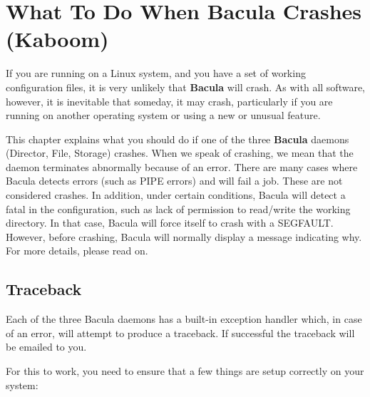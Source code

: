 
\chapter{What To Do When Bacula Crashes (Kaboom)}
\label{KaboomChapter}

If you are running on a Linux system, and you have a set of working
configuration files, it is very unlikely that {\bf Bacula} will crash. As with
all software, however, it is inevitable that someday, it may crash,
particularly if you are running on another operating system or using a new or
unusual feature. 

This chapter explains what you should do if one of the three {\bf Bacula}
daemons (Director, File, Storage) crashes.  When we speak of crashing, we 
mean that the daemon terminates abnormally because of an error.  There are
many cases where Bacula detects errors (such as PIPE errors) and will fail 
a job. These are not considered crashes.  In addition, under certain
conditions, Bacula will detect a fatal in the configuration, such as 
lack of permission to read/write the working directory. In that case,
Bacula will force itself to crash with a SEGFAULT. However, before
crashing, Bacula will normally display a message indicating why.    
For more details, please read on.
  

\section{Traceback}

Each of the three Bacula daemons has a built-in exception handler which, in
case of an error, will attempt to produce a traceback. If successful the
traceback will be emailed to you. 

For this to work, you need to ensure that a few things are setup correctly on
your system: 

